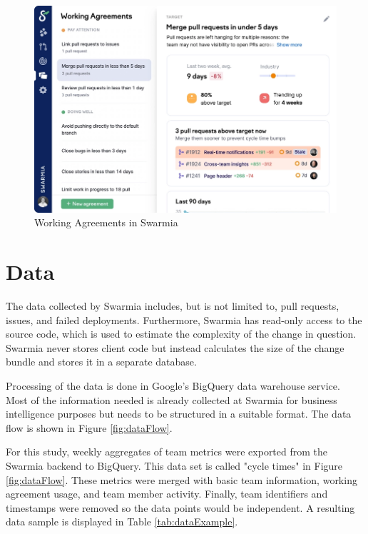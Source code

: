 \begin{figure}[h]
    \begin{center}
        \includegraphics[width=13.5cm]{LaTeX/images/improvement.png}
        \caption{Working Agreements in Swarmia}
        \label{fig:WorkingAgreements}
    \end{center}
\end{figure}

\section{Data}

The data collected by Swarmia includes, but is not limited to, pull requests, issues, and failed deployments. Furthermore, Swarmia has read-only access to the source code, which is used to estimate the complexity of the change in question. Swarmia never stores client code but instead calculates the size of the change bundle and stores it in a separate database. 

Processing of the data is done in Google's BigQuery data warehouse service. Most of the information needed is already collected at Swarmia for business intelligence purposes but needs to be structured in a suitable format. The data flow is shown in Figure \ref{fig:dataFlow}.





For this study, weekly aggregates of team metrics were exported from the Swarmia backend to BigQuery. This data set is called "cycle times" in Figure \ref{fig:dataFlow}. These metrics were merged with basic team information, working agreement usage, and team member activity. Finally, team identifiers and timestamps were removed so the data points would be independent. A resulting data sample is displayed in Table \ref{tab:dataExample}.

